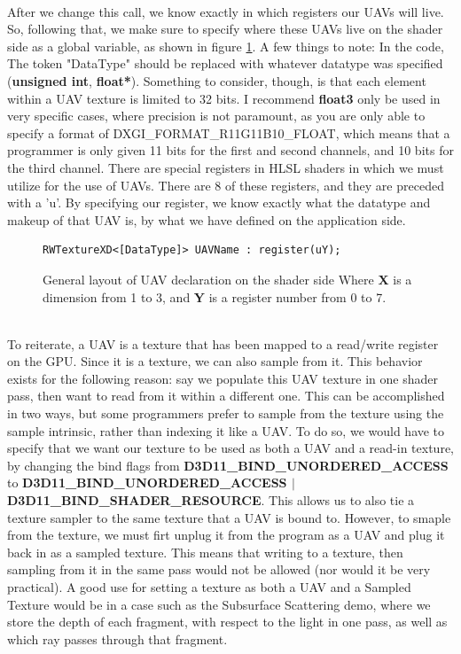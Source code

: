 \documentclass[a4paper, 12pt]{article}
\begin{document}
\noindent \\ After we change this call, we know exactly in which registers
our UAVs will live. So, following that, we make sure to specify where these
UAVs live on the shader side as a global variable, as shown in figure
\ref{code:UAVShaderSide}. A few things to note: In the code, The token
"DataType" should be replaced with whatever datatype was specified
(\textbf{unsigned int}, \textbf{float*}). Something to consider, though, is
that each element within a UAV texture is limited to 32 bits. I recommend
\textbf{float3} only be used in very specific cases, where precision is not
paramount, as you are only able to specify a format of
DXGI\_FORMAT\_R11G11B10\_FLOAT, which means that a programmer is only given 11
bits for the first and second channels, and 10 bits for the third channel.
There are special registers in HLSL shaders in which we must utilize for the
use of UAVs. There are 8 of these registers, and they are preceded with a
'u'. By specifying our register, we know exactly what the datatype and
makeup of that UAV is, by what we have defined on the application side.

\begin{figure}[h]
\begin{lstlisting}[language=HLSL]
RWTextureXD<[DataType]> UAVName : register(uY);
\end{lstlisting}
\caption{General layout of UAV declaration on the shader side Where \textbf{X} is a dimension from 1 to 3, and \textbf{Y} is a register number from 0 to 7. }
\label{code:UAVShaderSide}
\end{figure}

\noindent \\ To reiterate, a UAV is a texture that has been mapped to a
read/write register on the GPU. Since it is a texture, we can also sample from
it. This behavior exists for the following reason: say we populate this UAV
texture in one shader pass, then want to read from it within a different one.
This can be accomplished in two ways, but some programmers prefer to sample
from the texture using the sample intrinsic, rather than indexing it like a
UAV. To do so, we would have to specify that we want our texture to be used as
both a UAV and a read-in texture, by changing the bind flags from
\textbf{D3D11\_BIND\_UNORDERED\_ACCESS} to
\textbf{D3D11\_BIND\_UNORDERED\_ACCESS $|$ D3D11\_BIND\_SHADER\_RESOURCE}.
This allows us to also tie a texture sampler to the same texture that a UAV is
bound to. However, to smaple from the texture, we must firt unplug it from the
program as a UAV and plug it back in as a sampled texture. This means that
writing to a texture, then sampling from it in the same pass would not be
allowed (nor would it be very practical). A good use for setting a texture as
both a UAV and a Sampled Texture would be in a case such as the Subsurface
Scattering demo, where we store the depth of each fragment, with respect to
the light in one pass, as well as which ray passes through that fragment.
\end{document}
